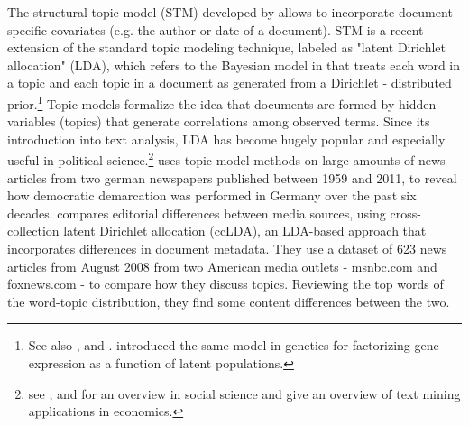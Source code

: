 \documentclass[12pt,a4paper,notitlepage]{article}
\begin{document}
The structural topic model (STM) developed by \citet{roberts_model_2016} allows to incorporate document specific covariates (e.g. the author or date of a document). STM is a recent extension of the standard topic modeling technique, labeled as "latent Dirichlet allocation" (LDA), which refers to the Bayesian model in \citet{blei_latent_2003} that treats each word in a topic and each topic in a document as generated from a Dirichlet - distributed prior.\footnote{See also \citet{griffiths_probabilistic_2002}, \citet{griffiths_finding_2004} and \citet{hofmann_probabilistic_1999}. \citet{pritchard_inference_2000} introduced the same model in genetics for factorizing gene expression as a function of latent populations.} Topic models formalize the idea that documents are formed by hidden variables (topics) that generate correlations among observed terms. Since its introduction into text analysis, LDA has become hugely popular and especially useful in political science.\footnote{see \citet{blei_probabilistic_2012}, \citet{grimmer_text_2013} and \citet{wiedmann_text_2016} for an overview in social science and \citet{gentzkow_text_2017} give an overview of text mining applications in economics.} \citet{wiedmann_text_2016} uses topic model methods on large amounts of news articles from two german newspapers published between 1959 and 2011, to reveal how democratic demarcation was performed in Germany over the past six decades. \citet{paul_cross-collection_2017} compares editorial differences between media sources, using cross-collection latent Dirichlet allocation (ccLDA), an LDA-based approach that incorporates differences in document metadata. They use a dataset of 623 news articles from August 2008 from two American media outlets - msnbc.com and foxnews.com - to compare how they discuss topics. Reviewing the top words of the word-topic distribution, they find some content differences between the two. 
\end{document}
